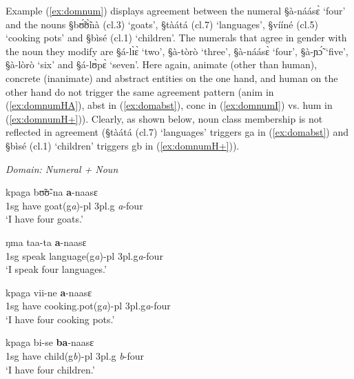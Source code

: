 Example (\ref{ex:domnum}) displays agreement between the numeral
{\S à-náásɛ̀} `four' and the nouns  {\S bʊ̃́ʊ̃̀nà}
({\sc cl.3}) `goats',  {\S tàátá} ({\sc cl.7})
`languages',  {\S vííné} ({\sc cl.5}) `cooking
pots' and  {\S bìsé} ({\sc cl.1}) `children'. The  numerals that agree
in gender with the noun they
modify are  {\S á-lɪ̀ɛ̀} `two',
 {\S à-tòrò} `three',  {\S à-náásɛ̀}
`four',  {\S à-ɲɔ̃́} `five',
 {\S à-lòrò} `six' and  {\S á-lʊ̀pɛ̀}
`seven'. Here again, animate (other than human), concrete (inanimate) and
abstract entities on the one hand, and human on the other hand do not
trigger the same agreement pattern ({\sc anim} in (\ref{ex:domnumHA}),
 {\sc abst} in  (\ref{ex:domabst}),   {\sc conc} in (\ref{ex:domnumI})  vs. 
{\sc hum} in  (\ref{ex:domnumH+})). Clearly, as shown below, noun
class membership is not reflected in agreement ({\S tàátá} ({\sc cl.7})
`languages' triggers {\sc g}a in (\ref{ex:domabst}) and 
 {\S bìsé} ({\sc cl.1}) `children' triggers {\sc g}b in (\ref{ex:domnumH+})).


\begin{exe}
  \ex\label{ex:domnum}{\it Domain: Numeral + Noun}\\
\begin{xlist}

\ex\label{ex:domnumHA}

  {kpaga}  {bʊ̃ʊ̃-na}  {\textbf{a}-naasɛ}  \\
       {\sc 1sg}  {have}  {goat({\sc g}{\it a})-{\sc pl}}  {{\sc 3pl.g}{\it
a}-four} \\
\glt `I have four goats.' \\

\ex\label{ex:domabst}

  {ŋma}  {taa-ta}  {\textbf{a}-naasɛ}  \\
        {\sc 1sg}  {speak}  {language({\sc g}{\it a})-{\sc pl}}   {{\sc
3pl.g}{\it a}-four} \\
\glt `I speak four languages.' \\



\ex\label{ex:domnumI}

  {kpaga}  {vii-ne}   {\textbf{a}-naasɛ}  \\
        {\sc 1sg}  {have}  {cooking.pot({\sc g}{\it a})-{\sc pl}}   {{\sc
3pl.g}{\it a}-four} \\
\glt `I have four cooking pots.' \\



\ex\label{ex:domnumH+}

  {kpaga}  {bi-se}  {\textbf{ba}-naasɛ}   \\
        {\sc 1sg}  {have}  {child({\sc g}{\it b})-{\sc pl}}   {{\sc 3pl.g}{\it
b}-four} \\
\glt `I have four children.' \\


\end{xlist}
\end{exe}



